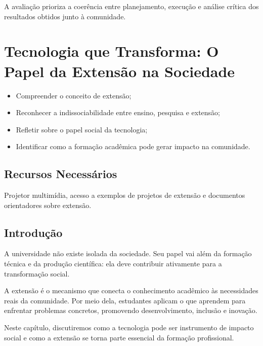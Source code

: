 \documentclass[12pt,a4paper]{article}
\begin{document}
A avaliação prioriza a coerência entre planejamento, execução e análise crítica dos resultados obtidos junto à comunidade.




\newpage


\section{Tecnologia que Transforma: O Papel da Extensão na Sociedade}

\begin{tcolorbox}[boxObjetivos]
\begin{itemize}
    \item Compreender o conceito de extensão;
    \item Reconhecer a indissociabilidade entre ensino, pesquisa e extensão;
    \item Refletir sobre o papel social da tecnologia;
    \item Identificar como a formação acadêmica pode gerar impacto na comunidade.
\end{itemize}
\end{tcolorbox}

\subsection*{Recursos Necessários}

Projetor multimídia, acesso a exemplos de projetos de extensão e documentos orientadores sobre extensão.

\subsection*{Introdução}

A universidade não existe isolada da sociedade. 
Seu papel vai além da formação técnica e da produção científica: ela deve contribuir ativamente para a transformação social.

A extensão é o mecanismo que conecta o conhecimento acadêmico às necessidades reais da comunidade. 
Por meio dela, estudantes aplicam o que aprendem para enfrentar problemas concretos, promovendo desenvolvimento, inclusão e inovação.

Neste capítulo, discutiremos como a tecnologia pode ser instrumento de impacto social e como a extensão se torna parte essencial da formação profissional.
\end{document}
